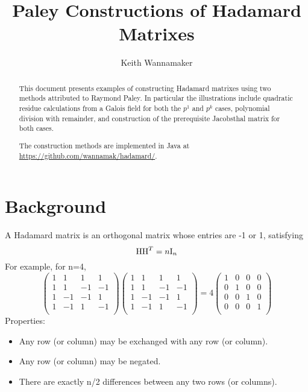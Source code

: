 \documentclass{article}
\title{Paley Constructions of Hadamard Matrixes}
\author{Keith Wannamaker}
\begin{document}
\maketitle

\begin{abstract}
This document presents examples of constructing Hadamard matrixes
using two methods attributed to Raymond Paley.  In particular
the illustrations include quadratic residue calculations from a
Galois field for both the $p^1$ and $p^k$ cases, polynomial
division with remainder, and construction of the prerequisite
Jacobsthal matrix for both cases.

The construction methods are implemented in Java at
\url{https://github.com/wannamak/hadamard/}.
\end{abstract}

\section{Background}

A Hadamard matrix is an orthogonal matrix whose entries are -1 or 1, satisfying
\begin{equation}
\textnormal{H}\textnormal{H}^{T} = {n}\textnormal{I}_{n}
\end{equation}
For example, for n=4,
\begin{equation}
\begin{pmatrix}
1 & 1 & 1 & 1 \\
1 & 1 & -1 & -1 \\
1 & -1 & -1 & 1 \\
1 & -1 & 1 & -1 \\
\end{pmatrix}
\begin{pmatrix}
1 & 1 & 1 & 1 \\
1 & 1 & -1 & -1 \\
1 & -1 & -1 & 1 \\
1 & -1 & 1 & -1 \\
\end{pmatrix}
= 4
\begin{pmatrix}
1 & 0 & 0 & 0 \\
0 & 1 & 0 & 0 \\
0 & 0 & 1 & 0 \\
0 & 0 & 0 & 1 \\
\end{pmatrix}
\end{equation}
Properties:
\begin{itemize}
\item Any row (or column) may be exchanged with any row (or column).
\item Any row (or column) may be negated.
\item There are exactly n/2 differences between any two rows (or columns).
\end{itemize}
\end{document}
